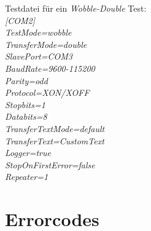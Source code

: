 Testdatei für ein \textit{Wobble-Double} Test:\\

\textit{
\hspace*{10mm}[COM2]\\
\hspace*{10mm}TestMode=wobble\\
\hspace*{10mm}TransferMode=double\\
\hspace*{10mm}SlavePort=COM3\\
\hspace*{10mm}BaudRate=9600-115200\\
\hspace*{10mm}Parity=odd\\
\hspace*{10mm}Protocol=XON/XOFF\\
\hspace*{10mm}Stopbits=1\\
\hspace*{10mm}Databits=8\\
\hspace*{10mm}TransferTextMode=default\\
\hspace*{10mm}TransferText=CustomText\\
\hspace*{10mm}Logger=true\\
\hspace*{10mm}StopOnFirstError=false\\
\hspace*{10mm}Repeater=1\\
}


\newpage
\section{Errorcodes}\label{Errorcodes}

